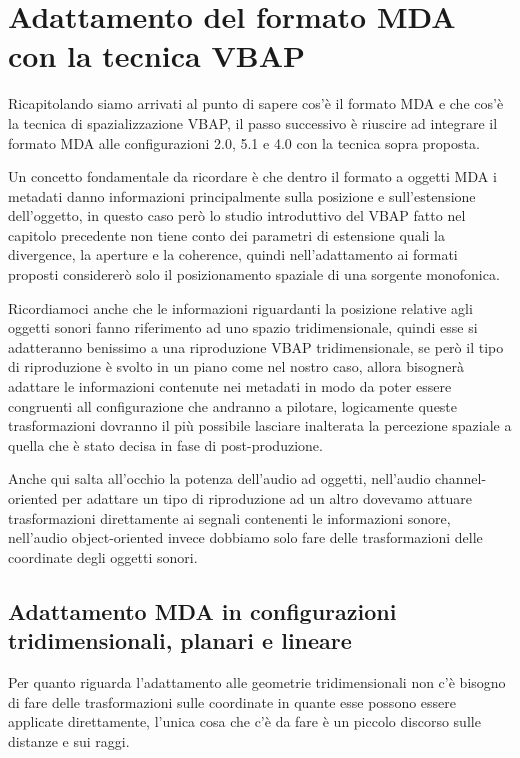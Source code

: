 \documentclass[12pt,a4paper]{report}
\begin{document}
\chapter{Adattamento del formato MDA con la tecnica VBAP}

Ricapitolando siamo arrivati al punto di sapere cos'è il formato MDA e che cos'è la tecnica di spazializzazione VBAP,
il passo successivo è riuscire ad integrare il formato MDA alle configurazioni 2.0, 5.1 e 4.0 con la tecnica sopra proposta.

Un concetto fondamentale da ricordare è che dentro il formato a oggetti MDA i metadati danno informazioni principalmente sulla posizione e sull'estensione dell'oggetto, in questo caso però lo studio introduttivo del VBAP fatto nel capitolo precedente non tiene conto dei parametri di estensione quali la divergence, la aperture e la coherence, quindi nell'adattamento ai formati proposti considererò solo il posizionamento spaziale di una sorgente monofonica.

Ricordiamoci anche che le informazioni riguardanti la posizione relative agli oggetti sonori fanno riferimento ad uno spazio tridimensionale, quindi esse si adatteranno benissimo a una riproduzione VBAP tridimensionale, se però il tipo di riproduzione è svolto in un piano come nel nostro caso, allora bisognerà adattare le informazioni contenute nei metadati in modo da poter essere congruenti all configurazione che andranno a pilotare, logicamente queste trasformazioni dovranno il più possibile lasciare inalterata la percezione spaziale a quella che è stato decisa in fase di post-produzione.

Anche qui salta all'occhio la potenza dell'audio ad oggetti, nell'audio channel-oriented per adattare un tipo di riproduzione ad un altro dovevamo attuare trasformazioni direttamente ai segnali contenenti le informazioni sonore, nell'audio object-oriented invece dobbiamo solo fare delle trasformazioni delle coordinate degli oggetti sonori.

\section{Adattamento MDA in configurazioni tridimensionali, planari e lineare}

Per quanto riguarda l'adattamento alle geometrie tridimensionali non c'è bisogno di fare delle trasformazioni sulle coordinate in quante esse possono essere applicate direttamente, l'unica cosa che c'è da fare è un piccolo discorso sulle distanze e sui raggi.
\end{document}
